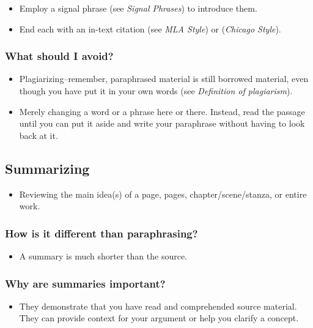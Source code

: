 \begin{itemize}
\item Employ a signal phrase (see \emph{Signal Phrases}) to introduce them.

\item End each with an in-text citation (see \emph{MLA Style}) or (\emph{Chicago Style}).
\end{itemize}

\subsubsection {What should I avoid?}

\begin{itemize}

\item Plagiarizing--remember, paraphrased material is still borrowed material, even though you have put it in your own words (see \emph{Definition of plagiarism}).

\item Merely changing a word or a phrase here or there. Instead, read the passage until you can put it aside and write your paraphrase without having to look back at it.
\end{itemize}


\subsection{Summarizing}

\begin{itemize}

\item Reviewing the main idea(s) of a page, pages, chapter/scene/stanza, or entire work.

\end{itemize}
\subsubsection {How is it different than paraphrasing?}

\begin{itemize}
\item A summary is much shorter than the source.
\end{itemize}
\subsubsection {Why are summaries important?}

\begin{itemize}
\item They demonstrate that you have read and comprehended source material. They can provide context for your argument or help you clarify a concept.
\end{itemize}


